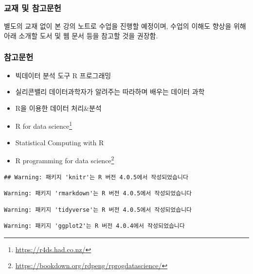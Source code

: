 \documentclass[
  11pt,
]{krantz}
\makeatletter
\providecommand{\tightlist}{%
  \setlength{\itemsep}{0pt}\setlength{\parskip}{0pt}}
\renewcommand{\href}[2]{#2\footnote{\url{#1}}}
\newenvironment{kframe}{%
\medskip{}
\setlength{\fboxsep}{.8em}
 \def\at@end@of@kframe{}%
 \ifinner\ifhmode%
  \def\at@end@of@kframe{\end{minipage}}%
  \begin{minipage}{\columnwidth}%
 \fi\fi%
 \def\FrameCommand##1{\hskip\@totalleftmargin \hskip-\fboxsep
 \colorbox{shadecolor}{##1}\hskip-\fboxsep
     \hskip-\linewidth \hskip-\@totalleftmargin \hskip\columnwidth}%
 \MakeFramed {\advance\hsize-\width
   \@totalleftmargin\z@ \linewidth\hsize
   \@setminipage}}%
 {\par\unskip\endMakeFramed%
 \at@end@of@kframe}
\renewenvironment{quote}{\begin{kframe}}{\end{kframe}}
\makeatother
\begin{document}
\hypertarget{material-course}{%
\subsubsection*{교재 및 참고문헌}\label{material-course}}


\begin{quote}
별도의 교재 없이 본 강의 노트로 수업을 진행할 예정이며, 수업의 이해도 향상을 위해 아래 소개할 도서 및 웹 문서 등을 참고할 것을 권장함.
\end{quote}

\hypertarget{ref-course}{%
\subsubsection*{참고문헌}\label{ref-course}}


\begin{itemize}
\tightlist
\item
  빅데이터 분석 도구 R 프로그래밍 \citep{noman-2012}
\item
  실리콘밸리 데이터과학자가 알려주는 따라하며 배우는 데이터 과학 \citep{kwon-2017}
\item
  R을 이용한 데이터 처리\&분석 \citep{seo-2014}
\item
  \href{https://r4ds.had.co.nz/}{R for data science} \citep{wickham-2016r}
\item
  Statistical Computing with R \citep{rizzo-2019}
\item
  \href{https://bookdown.org/rdpeng/rprogdatascience/}{R programming for data science} \citep{peng-2016}
\end{itemize}

\mainmatter

\begin{verbatim}
## Warning: 패키지 'knitr'는 R 버전 4.0.5에서 작성되었습니다
\end{verbatim}

\footnotesize

\begin{verbatim}
Warning: 패키지 'rmarkdown'는 R 버전 4.0.5에서 작성되었습니다
\end{verbatim}

\begin{verbatim}
Warning: 패키지 'tidyverse'는 R 버전 4.0.5에서 작성되었습니다
\end{verbatim}

\begin{verbatim}
Warning: 패키지 'ggplot2'는 R 버전 4.0.4에서 작성되었습니다
\end{verbatim}
\end{document}
